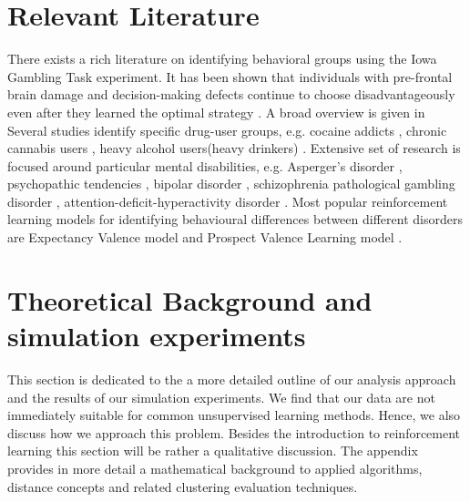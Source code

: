 \documentclass[12pt,a4paper,bibliography=totocnumbered,listof=totocnumbered]{scrartcl}
\begin{document}
\pagebreak

\section{Relevant Literature}

There exists a rich literature on identifying behavioral groups using the Iowa Gambling Task experiment. It has been shown that individuals with pre-frontal brain damage and decision-making defects continue to choose disadvantageously even after they learned the optimal strategy \cite{Bechara1997}. A broad overview is given in \cite{Steingroever2013} Several studies identify specific drug-user groups, e.g. cocaine addicts \cite{Stout2004}, chronic cannabis users \cite{Fridberg2010}, heavy alcohol users(heavy drinkers) \cite{Gullo2011}. Extensive set of research is focused around particular mental disabilities, e.g. Asperger's disorder \cite{Johnson2006}, psychopathic tendencies \cite{Blair2001}, bipolar disorder \cite{Brambilla2012}, schizophrenia \cite{Martino2007} pathological gambling disorder \cite{Cavedini2002}, attention-deficit-hyperactivity disorder \cite{NiritAgay2010}. Most popular reinforcement learning models for identifying behavioural differences between different disorders are Expectancy Valence model \cite{Busemeyer2002} and Prospect Valence Learning model \cite{Ahn2008}.

\pagebreak

\section{Theoretical Background and simulation experiments}

This section is dedicated to the a more detailed outline of our analysis approach and the results of our simulation experiments. We find that our data are not immediately suitable for common unsupervised learning methods. Hence, we also discuss how we approach this problem. Besides the introduction to reinforcement learning this section will be rather a qualitative discussion. The appendix provides in more detail a mathematical background to applied algorithms, distance concepts and related clustering evaluation techniques. 
\end{document}
